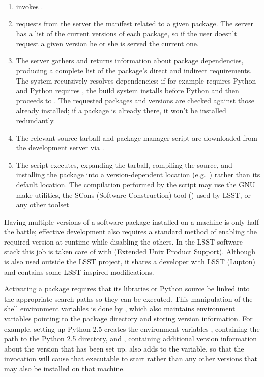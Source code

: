 \begin{enumerate}

\item{ invokes .}

\item{ requests from the server  the manifest
related to a given package. The server has a list of the current versions of
each package, so if the user doesn't request a given version he or she is served
the current one.}

\item{The server gathers and returns information about package dependencies,
producing a complete list of the package's direct and indirect requirements. The
system recursively resolves dependencies; if for example  requires
Python and Python requires , the build system installs
 before Python and then proceeds to . The requested
packages and versions are checked against those already installed; if a package
is already there, it won't be installed redundantly.}

\item{The relevant source tarball and  package manager script are
downloaded from the development server via .}

\item{The  script executes, expanding the tarball, compiling the
source, and installing the package into a version-dependent location
(e.g.~) rather than its default location.
The compilation performed by the  script may use the GNU make
utilities, the SCons (Software Construction) tool
() used by LSST, or any other toolset} 

\end{enumerate}

Having multiple versions of a software package installed on a machine
is only half the battle; effective development also requires a
standard method of enabling the required version at runtime while disabling the others. In
the LSST software stack this job is taken care of with  (Extended
Unix Product Support). Although  is also used outside the LSST
project, it shares a developer with LSST (Lupton) and contains some
LSST-inspired modifications.

Activating a package requires that its libraries or Python source be linked into
the appropriate search paths so they can be executed. This manipulation of the
shell environment variables is done by , which also maintains
environment variables pointing to the package directory and storing version
information. For example, setting up Python 2.5 creates the environment
variables , containing the path to the Python 2.5 directory,
and , containing additional version information about the
version that has been set up.  also adds
 to the  variable, so
that the invocation  will cause that executable to start rather
than any other versions that may also be installed on that machine.

